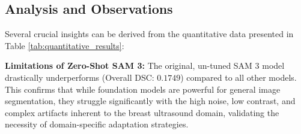 \begin{table}[htbp]
\centering
\caption{Quantitative comparison (Mean Dice and Mean IoU) of different architectures on four external ultrasound datasets. The best results for each dataset are highlighted in \textbf{bold}.}
\label{tab:quantitative_results}
\end{table}

\subsection{Analysis and Observations}

Several crucial insights can be derived from the quantitative data presented in Table \ref{tab:quantitative_results}:

\textbf{Limitations of Zero-Shot SAM 3:}
The original, un-tuned SAM 3 model drastically underperforms (Overall DSC: $0.1749$) compared to all other models. This confirms that while foundation models are powerful for general image segmentation, they struggle significantly with the high noise, low contrast, and complex artifacts inherent to the breast ultrasound domain, validating the necessity of domain-specific adaptation strategies.

